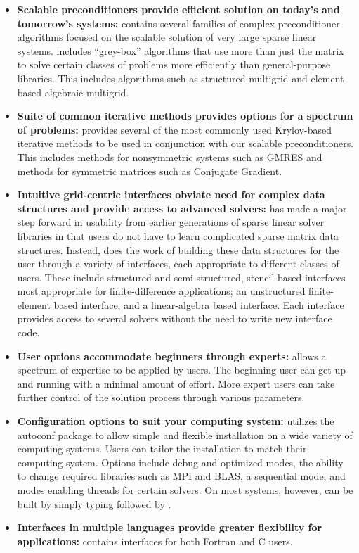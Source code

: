 \begin{itemize}

\item
{\bf Scalable preconditioners provide efficient solution on today's
and tomorrow's systems:} \hypre{} contains several families of complex
preconditioner algorithms focused on the scalable solution of very
large sparse linear systems. \hypre{} includes ``grey-box'' algorithms
that use more than just the matrix to solve certain classes of
problems more efficiently than general-purpose libraries. This
includes algorithms such as structured multigrid and element-based
algebraic multigrid.

\item
{\bf Suite of common iterative methods provides options for a spectrum
of problems:} \hypre{} provides several of the most commonly used
Krylov-based iterative methods to be used in conjunction with our
scalable preconditioners. This includes methods for nonsymmetric
systems such as GMRES and methods for symmetric matrices such as
Conjugate Gradient.

\item
{\bf Intuitive grid-centric interfaces obviate need for complex data
structures and provide access to advanced solvers:} \hypre{} has made
a major step forward in usability from earlier generations of sparse
linear solver libraries in that users do not have to learn complicated
sparse matrix data structures.  Instead, \hypre{} does the work of
building these data structures for the user through a variety of
interfaces, each appropriate to different classes of users.  These
include structured and semi-structured, stencil-based interfaces most
appropriate for finite-difference applications; an unstructured
finite-element based interface; and a linear-algebra based interface.
Each interface provides access to several solvers without the need to
write new interface code.

\item
{\bf User options accommodate beginners through experts:} \hypre{}
allows a spectrum of expertise to be applied by users. The beginning
user can get up and running with a minimal amount of effort. More
expert users can take further control of the solution process through
various parameters.

\item
{\bf Configuration options to suit your computing system:} \hypre{}
utilizes the autoconf package to allow simple and flexible
installation on a wide variety of computing systems.  Users can tailor
the installation to match their computing system. Options include
debug and optimized modes, the ability to change required libraries
such as MPI and BLAS, a sequential mode, and modes enabling threads
for certain solvers.  On most systems, however, \hypre{} can be built
by simply typing  followed by .

\item
{\bf Interfaces in multiple languages provide greater flexibility for
applications:} \hypre{} contains interfaces for both Fortran and C
users.

\end{itemize}

